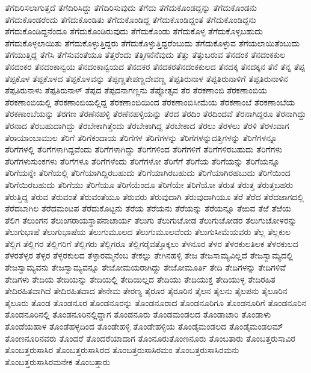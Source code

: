 {ತೆಗೆದಿರಿಸಲಾಗುತ್ತದೆ
ತೆಗೆದಿರಿಸಿದ್ದು
ತೆಗೆದಿರಿಸುವುದು
ತೆಗೆದು
ತೆಗೆದುಕೊಂಡದ್ದನ್ನು
ತೆಗೆದುಕೊಂಡನು
ತೆಗೆದುಕೊಂಡರೆಂದು
ತೆಗೆದುಕೊಂಡಿತು
ತೆಗೆದುಕೊಂಡಿದ್ದ
ತೆಗೆದುಕೊಂಡಿದ್ದಂತೆ
ತೆಗೆದುಕೊಂಡಿದ್ದನು
ತೆಗೆದುಕೊಂಡಿದ್ದನೆಂದೂ
ತೆಗೆದುಕೊಂಡಿರುವುದು
ತೆಗೆದುಕೊಂಡು
ತೆಗೆದುಕೊಳ್ಳ
ತೆಗೆದುಕೊಳ್ಳಬಹುದು
ತೆಗೆದುಕೊಳ್ಳಲಾಯಿತು
ತೆಗೆದುಕೊಳ್ಳುತ್ತಿದ್ದರು
ತೆಗೆದುಕೊಳ್ಳುತ್ತಿದ್ದರೆಂಬುದು
ತೆಗೆದುಕೊಳ್ಳುವ
ತೆಗೆಯಲಾಯಿತೆಂಬುದು
ತೆಗೆಯುತ್ತಿದ್ದ
ತೆಗೆಸಿ
ತೆಗೆಸುವಂತೆಯೂ
ತೆತ್ತರೆಂದು
ತೆತ್ತಿಗನೆನೆವುದು
ತೆತ್ತು
ತೆತ್ತುಬರುವ
ತೆನದಂಕ
ತೆನದಂಕಕುಲ
ತೆನದಂಕರ
ತೆನದಂಕಾನ್ವಯ
ತೆನದಂಕಾನ್ವಯದ
ತೆನದಕರ
ತೆನದಕರತೆನದಂಕಕುಲದ
ತೆನದಕ್ಕ
ತೆನದಕ್ಕನ
ತೆನೆ
ತೆನ್ನ
ತೆಪ್ಪ
ತೆಪ್ಪಕೊಳ
ತೆಪ್ಪಕೊಳದ
ತೆಪ್ಪಕೊಳವನ್ನು
ತೆಪ್ಪಣ್ಣತೇಪಣ್ಣದೇವಣ್ಣ
ತೆಪ್ಪತಿರುನಾಳ
ತೆಪ್ಪತಿರುನಾಳಿಗೆ
ತೆಪ್ಪತಿರುನಾಳಿನ
ತೆಪ್ಪತಿರುನಾಳು
ತೆಪ್ಪತಿರುನಾಳ್
ತೆಪ್ಪದ
ತೆಪ್ಪದನಾಗಣ್ಣನು
ತೆಪ್ಪೋತ್ಸವ
ತೆರ
ತೆರಕಣಾಂಬಿ
ತೆರಕಣಾಂಬಿಯ
ತೆರಕಣಾಂಬಿಯಲ್ಲಿ
ತೆರಕಣಾಂಬಿಯಲ್ಲಿದ್ದ
ತೆರಕಣಾಂಬಿಯಿಂದ
ತೆರಕಣಾಂಬಿಸೀಮೆಯ
ತೆರಕಣಾಂಬೆ
ತೆರಕಣಾಂಬೆಯ
ತೆರಕಣಾಂಬೆಯನ್ನು
ತೆರಗಣ
ತೆರಣೆನಹಳ್ಳಿ
ತೆರಣೆನಹಳ್ಳಿಯನ್ನು
ತೆರದ
ತೆರದಿಂ
ತೆರದಿಂದವೆ
ತೆರನಾಗಿದ್ದರೂ
ತೆರನಾಗಿದ್ದು
ತೆರನಾದ
ತೆರಬಹುದಾಗಿದ್ದು
ತೆರಬೇಕಾಗಿತ್ತೆಂದು
ತೆರಬೇಕಾಗಿದ್ದ
ತೆರಬೇಕಾದ
ತೆರಲು
ತೆರಳಲು
ತೆರಳಿ
ತೆರಳುವಾಗ
ತೆರಾಯಾಂಬಾಮುಲ
ತೆರಿಗೆ
ತೆರಿಗೆಕಂದಾಯ
ತೆರಿಗೆಗಳ
ತೆರಿಗೆಗಳನ್ನು
ತೆರಿಗೆಗಳನ್ನುದತ್ತಿಗಳನ್ನು
ತೆರಿಗೆಗಳನ್ನೂ
ತೆರಿಗೆಗಳಲ್ಲಿ
ತೆರಿಗೆಗಳಾಗಿದ್ದವೆಂದು
ತೆರಿಗೆಗಳಾಗಿದ್ದು
ತೆರಿಗೆಗಳಿಂದ
ತೆರಿಗೆಗಳಿಗೆ
ತೆರಿಗೆಗಳಿರಬಹುದು
ತೆರಿಗೆಗಳು
ತೆರಿಗೆಗಳುಸುಂಕಗಳು
ತೆರಿಗೆಗಳೂ
ತೆರಿಗೆಗಳೆಂದು
ತೆರಿಗೆಗಳೋ
ತೆರಿಗೆಗೆ
ತೆರಿಗೆಯ
ತೆರಿಗೆಯನ್ನು
ತೆರಿಗೆಯನ್ನೂ
ತೆರಿಗೆಯನ್ನೇ
ತೆರಿಗೆಯಲ್ಲಿ
ತೆರಿಗೆಯಾಗಿದ್ದಿರಬಹುದು
ತೆರಿಗೆಯಾಗಿರಬಹುದು
ತೆರಿಗೆಯಾಗಿರಹಬುದು
ತೆರಿಗೆಯಿಂದ
ತೆರಿಗೆಯಿರಬಹುದು
ತೆರಿಗೆಯು
ತೆರಿಗೆಯೂ
ತೆರಿಗೆಯೆಂದೂ
ತೆರಿಗೆಯೇ
ತೆರಿಗೆಯೋ
ತೆರುತ
ತೆರುತ್ತ
ತೆರುತ್ತಬಹರು
ತೆರುತ್ತಿದ್ದ
ತೆರುವ
ತೆರುವಂತೆ
ತೆರುವಂತೆಯೂ
ತೆರುವರು
ತೆರುವುದಾಗಿ
ತೆರುವುದಾಗಿಯೂ
ತೆರೆ
ತೆರೆದ
ತೆರೆದಜಾಗದಲ್ಲಿ
ತೆರೆದಬಾಗಿಲ
ತೆರೆದಮಂಟಪ
ತೆರೆದುಕೊಟ್ಟನು
ತೆರೆಯ
ತೆರೆಯನು
ತೆರೆಯನ್ನು
ತೆರೆಯನ್ನೂ
ತೆಱುವ
ತೆಱೆ
ತೆಱೆಯ
ತೆಲಿಗ
ತೆಲುಂಗನ
ತೆಲುಂಗರಾಯಸ್ಥಾಪನಾಚಾರ್ಯ
ತೆಲುಗು
ತೆಲುಗುಚೋಡ
ತೆಲುಗುಚೋಡರ
ತೆಲುಗುಚೋಳರನ್ನು
ತೆಲುಗುಭಾಷೆ
ತೆಲುಗುಭಾಷೆಯ
ತೆಲುಗುಮೂಲದ
ತೆಲುಗುಮೂಲವೆಂದು
ತೆಲುಗುಸೀಮೆಯವರು
ತೆಲ್ಲ
ತೆಲ್ಲಕುಲ
ತೆಲ್ಲಿಗ
ತೆಲ್ಲಿಗರ
ತೆಲ್ಲಿಗರಿಗೆ
ತೆಲ್ಲಿಗರು
ತೆಲ್ಲಿಗರೂ
ತೆಲ್ಲಿಗರೈವತ್ತೊಕ್ಕಲು
ತೆಳನೂರ
ತೆಳರ
ತೆಳರಕುಲತಿಲಕ
ತೆಳರಕುಲದ
ತೆಳರತೆಳ್ಳರ
ತೆಳ್ಳರ
ತೆಳ್ಳರಕುಲದ
ತೆಳ್ಳಾರಮ್ಮನೆಂಬ
ತೇಕಲ್ಲು
ತೇಗಿನಹಳ್ಳಿ
ತೇಜ
ತೇಜಸಾಮ್ಯವಿಲ್ಲದೆ
ತೇಜಸ್ವಾಮ್ಯದಲ್ಲಿ
ತೇಜಸ್ವಾಮ್ಯವನು
ತೇಜಸ್ವಾಮ್ಯವನ್ನೂ
ತೇಜೋಮಯರಾಗಿದ್ದು
ತೇಜೋಮೂರ್ತಿ
ತೇದಿ
ತೇದಿಗಳನ್ನು
ತೇದಿಗಳಿವೆ
ತೇದಿಗಳು
ತೇದಿಯ
ತೇದಿಯನ್ನು
ತೇದಿಯಲ್ಲಿ
ತೇದಿಯಿಲ್ಲದ
ತೇದಿಯು
ತೇದಿಯುಕ್ತ
ತೇದಿಯುಳ್ಳ
ತೇದಿರಹಿತ
ತೇದಿರಹಿತವಾಗಿದೆ
ತೇದಿರಹಿತವಾದ
ತೇನೇಮ
ತೇರಣ್ಯ
ತೈರೂರ
ತೈರೂರಿನ
ತೈಲನ
ತೈಲನು
ತೈಲಪನು
ತೈಲೂರಿನ
ತೈಲೂರು
ತೊಂಡ
ತೊಂಡನೂರ
ತೊಂಡನೂರನ್ನು
ತೊಂಡನೂರಾದ
ತೊಂಡನೂರಿಗೂ
ತೊಂಡನೂರಿಗೆ
ತೊಂಡನೂರಿನ
ತೊಂಡನೂರಿನಲ್ಲಿ
ತೊಂಡನೂರಿನಲ್ಲಿದ್ದಾಗ
ತೊಂಡನೂರು
ತೊಂಡಮಂಡಲದ
ತೊಂಡಾಚಾರಿ
ತೊಂಡಾಳು
ತೊಂಡೆಯಹಾಳ
ತೊಂಡೆಹಳ್ಳದಿಂದ
ತೊಂಡೇಹಳ್ಳಿ
ತೊಂಡೇಹಳ್ಳಿಯ
ತೊಂಡೈಮಂಡಲದ
ತೊಂಡೈಮಂಡಲಮ್
ತೊಂಣನೂರಿನವರು
ತೊಂದರೆ
ತೊಂದರೆಯಾದಾಗ
ತೊಂನೂರುತೊಂಣನೂರು
ತೊಂಬತಾರು
ತೊಂಬತ್ತರುಸಾವಿರ
ತೊಂಬತ್ತರುಸಾಸಿರ
ತೊಂಬತ್ತರುಸಾಸಿರದ
ತೊಂಬತ್ತರುಸಾಸಿರಮಂ
ತೊಂಬತ್ತರುಸಾಸಿರಮನು
ತೊಂಬತ್ತರುಸಾಸಿರಮನೇಕ
ತೊಂಬತ್ತಾರು
}
